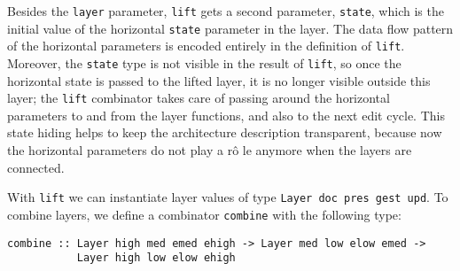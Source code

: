 \par Besides the \texttt{layer} parameter, \texttt{lift} gets a second
      parameter, \texttt{state}, which is the initial value of the horizontal
      \texttt{state} parameter in the layer. The data flow pattern of the horizontal
      parameters is encoded entirely in the definition of \texttt{lift}. Moreover,
      the \texttt{state} type is not visible in the result of \texttt{lift}, so once
      the horizontal state is passed to the lifted layer, it is no longer visible
      outside this layer; the \texttt{lift} combinator takes care of passing around
      the horizontal parameters to and from the layer functions, and also to the next
      edit cycle. This state hiding helps to keep the architecture description
      transparent, because now the horizontal parameters do not play a r\^o le
      anymore when the layers are connected.
\par {}With \texttt{lift} we can instantiate
      layer values of type \texttt{Layer doc pres gest upd}. To combine layers, we
      define a combinator \texttt{combine} with the following type:\begin{small}\begin{verbatim}combine :: Layer high med emed ehigh -> Layer med low elow emed -> 
           Layer high low elow ehigh\end{verbatim}\end{small}

